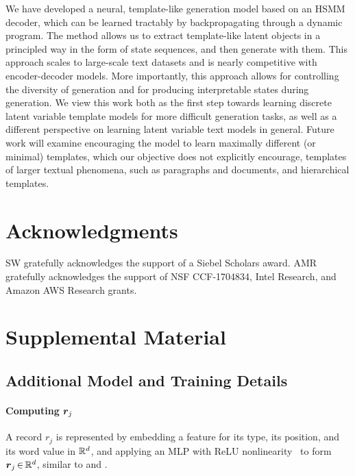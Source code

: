 \documentclass[11pt,a4paper]{article}
\begin{document}
We have developed a neural, template-like generation model based on an HSMM decoder, which can be learned tractably by backpropagating through a dynamic program. The method allows us to extract template-like latent objects in a principled way in the form of state sequences, and then generate with them. This approach scales to large-scale text datasets and is nearly competitive with encoder-decoder models. More importantly, this approach allows for controlling the diversity of generation and for producing interpretable states during generation.  We view this work both as the first step towards learning discrete latent variable template models for more difficult generation tasks, as well as a different perspective on learning latent variable text models in general.  Future work will examine encouraging the model to learn maximally different (or minimal) templates, which our objective does not explicitly encourage, templates of larger textual phenomena, such as paragraphs and documents, and hierarchical templates.

\section*{Acknowledgments}
SW gratefully acknowledges the support of a Siebel Scholars award. AMR gratefully acknowledges the support of NSF CCF-1704834, Intel Research, and Amazon AWS Research grants.

\nocite{tran2016unsupervised}




\appendix
\section{Supplemental Material}
\label{sec:supplemental}
\subsection{Additional Model and Training Details}
\paragraph{Computing $\boldsymbol{r}_j$}
A record $r_j$ is represented by embedding a feature for its type, its position, and its word value in $\mathbb{R}^d$, and applying an MLP with ReLU nonlinearity~\citep{nair2010rectified} to form $\boldsymbol{r}_j \, {\in} \, \mathbb{R}^d$, similar to \citet{yang2016reference} and \citet{wiseman2017challenges}.
\end{document}
